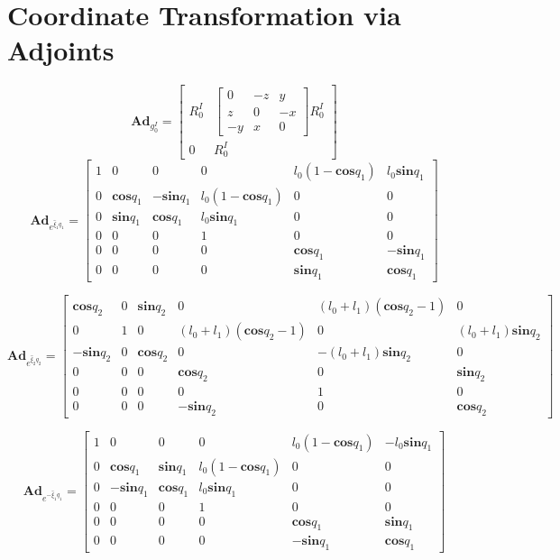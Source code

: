 \documentclass[lettersize,journal]{IEEEtran}
\def \Ad {\textbf{Ad}}
\def \sin {\textbf{sin}}
\def \cos {\textbf{cos}}
\theoremstyle{remark}
\begin{document}
\chapter{Coordinate Transformation via Adjoints}\label{appendix:adjoints}
\begin{strip}

\begin{equation*}
    \Ad_{g^I_0}=\begin{bmatrix}R_0^I & \begin{bmatrix}
    0 & -z & y\\z & 0 & -x\\-y & x & 0\end{bmatrix} R_0^ I \\0& R_0^I\end{bmatrix}
\end{equation*}
\begin{equation*}
    \Ad_{e^{\hat{\xi}_1q_1}}=\begin{bmatrix}1 & 0 & 0 & 0 & l_0(1-\cos q_1) & l_0 \sin q_1\\0 &\cos q_1 & -\sin q_1 & l_0(1-\cos q_1) & 0 & 0 \\0 & \sin q_1  & \cos q_1 & l_0\sin q_1 &0 & 0\\ 0 & 0 & 0& 
    1 & 0 & 0 \\0 & 0 & 0& 0 &\cos q_1 & -\sin q_1 \\0 & 0 & 0& 0 & \sin q_1  & \cos q_1
    \end{bmatrix}
\end{equation*}

\begin{equation*}
    \Ad_{e^{\hat{\xi}_2q_2}}=\begin{bmatrix}\cos q_2 & 0 & \sin q_2 & 0 & (l_0+l_1)(\cos q_2-1) & 0\\0 &1 & 0 & (l_0+l_1)(\cos q_2-1) & 0 & (l_0+l_1)\sin q_2 \\ -\sin q_2 & 0  & \cos q_2 & 0 &-(l_0+l_1)\sin q_2 & 0\\ 0 & 0 & 0& 
    \cos q_2 & 0 & \sin q_2 \\0 & 0 & 0& 0 & 1 & 0 \\0 & 0 & 0& -\sin q_2 & 0 & \cos q_2
    \end{bmatrix}
\end{equation*}

\begin{equation*}
    \Ad_{e^{-\hat{\xi}_1q_1}}=\begin{bmatrix}1 & 0 & 0 & 0 & l_0(1-\cos q_1) & -l_0 \sin q_1\\0 &\cos q_1 & \sin q_1 & l_0(1-\cos q_1) & 0 & 0 \\0 & -\sin q_1  & \cos q_1 & l_0\sin q_1 &0 & 0\\ 0 & 0 & 0& 
    1 & 0 & 0 \\0 & 0 & 0& 0 &\cos q_1 & \sin q_1 \\0 & 0 & 0& 0 & -\sin q_1  & \cos q_1
    \end{bmatrix}
\end{equation*}


\end{strip}
\end{document}
